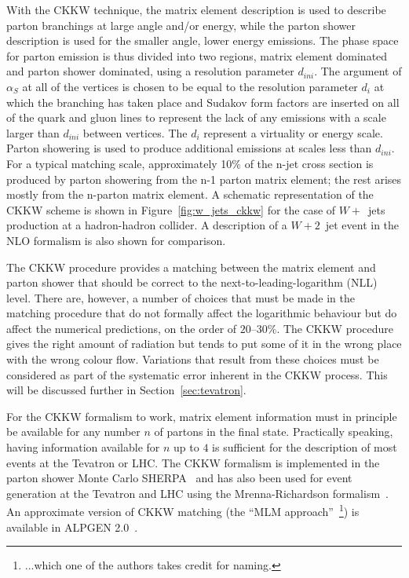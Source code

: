 \documentclass[12pt]{iopart}
\def\as{\alpha_S}
\begin{document}
With the CKKW technique,  the matrix element  description is used to describe parton branchings at 
large angle and/or energy, while the parton shower description is used for the smaller angle, lower 
energy emissions. The phase space for parton emission is thus divided into two regions, matrix element
dominated and parton shower dominated, using a resolution parameter $d_{ini}$. The argument of
$\as$ at all of the vertices is chosen to be equal to the resolution parameter $d_i$ at which the
branching has taken place and Sudakov form factors are inserted on all of the quark and gluon lines to
represent the lack of any emissions with a  scale larger than $d_{ini}$ between vertices. The $d_i$
represent a virtuality or energy scale. Parton showering is used to produce additional emissions at
scales less than $d_{ini}$. For a typical matching scale, approximately 10\% of the n-jet cross section is produced by parton showering from the n-1 parton matrix element; the rest arises mostly from the n-parton matrix element. A schematic representation of the CKKW scheme is shown in
Figure~\ref{fig:w_jets_ckkw} for the case of $W +$~jets production at a hadron-hadron collider. A
description of a $W + 2$~jet event in the NLO formalism is also shown for comparison.

The CKKW procedure provides a matching between the matrix  element and parton shower that should be
correct to the next-to-leading-logarithm (NLL) level. There are, however, a number of choices that
must be made in the matching procedure that do not formally affect the logarithmic behaviour but do
affect the numerical predictions, on the order of $20$--$30\%$. The CKKW procedure gives the right amount
of radiation but tends to put some of it in the wrong place with the wrong colour flow. Variations that
result from  these choices must be considered as part of the systematic error inherent in the CKKW
process. This will be discussed further in Section~\ref{sec:tevatron}.

For the CKKW formalism to work, matrix element information must in principle be available for any
number $n$ of partons in the final state. Practically speaking, having information available for $n$ up
to $4$ is sufficient for  the description of most events at the Tevatron or LHC. The CKKW formalism is
implemented in the parton shower Monte Carlo SHERPA~\cite{Gleisberg:2004hm} and has also been used for
event generation at the Tevatron and LHC using the Mrenna-Richardson formalism~\cite{Mrenna:2003if}.
An approximate version of CKKW matching (the ``MLM approach''~\footnote{...which one of the authors takes
credit for naming.}) is available in ALPGEN 2.0~\cite{Mangano:2002ea}.
\end{document}
